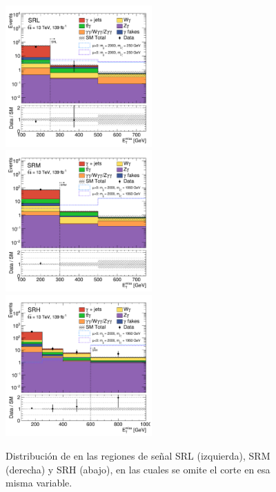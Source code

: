 \begin{figure}[!hb]
   \begin{center}
   \includegraphics[width=0.5\textwidth]{images_tmp/results/fr2_unblind/sigReg_SRL_fr2_met_et.pdf}%
   \includegraphics[width=0.5\textwidth]{images_tmp/results/fr2_unblind/sigReg_SRM_fr2_met_et.pdf}
   \includegraphics[width=0.5\textwidth]{images_tmp/results/fr2_unblind/sigReg_SRH_fr2_met_et.pdf}
   \caption{Distribución de \met en las regiones de señal SRL (izquierda), SRM (derecha) y SRH (abajo), en las cuales se omite el corte en esa misma variable.}
   \label{fig:met_n-1_SRL_SRM_SRH_fr2}
 \end{center}
\end{figure}



